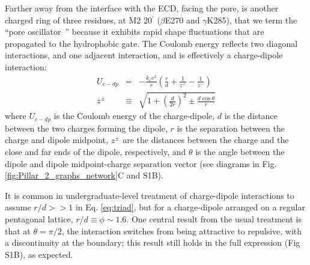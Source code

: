 \documentclass[journal=jacsat,manuscript=article]{achemso}
\newcommand{\sFigEnergy}{S1}
\newcommand{\triad}{pore oscillator~}
\begin{document}
Farther away from the interface with the ECD, facing the pore, is another charged ring of three residues, at M2 20$^{\prime}$ ($\beta$E270 and $\gamma$K285), that we term the ``\triad'' because it exhibits rapid shape fluctuations that are propagated to the hydrophobic gate.  The Coulomb energy reflects two diagonal interactions, and one adjacent interaction, and is effectively a charge-dipole interaction: %
\begin{eqnarray}
U_{c-dp} &=&- { \frac{k_{e} e^{2}}{r}}\left(\frac{r}{d} + \frac{1}{z^{+}} 
- \frac{1}{z^{-}}\right)\label{eq:triad} \\ 
  z^{\pm}&\equiv&\sqrt{{1+\left(\frac{d}{2 r}\right)^{2} \pm  \frac{ d\cos \theta}{r} }}
\end{eqnarray}
where $U_{c-dp}$ is the Coulomb energy of the charge-dipole, $d$ is the distance between the two charges forming the dipole, $r$ is the separation between the charge and dipole midpoint, $z^{\pm}$ are the distances between the charge and the close and far ends of the dipole, respectively, and $\theta$ is the angle between the dipole and dipole midpoint-charge separation vector (see diagrams in Fig. \ref{fig:Pillar_2_graphs_network}C and \sFigEnergy B). 

It is common in undergraduate-level treatment of charge-dipole interactions to assume $r/d>> 1$ in Eq. \ref{eq:triad}, but for a charge-dipole arranged on a regular pentagonal lattice,  $r/d \equiv \phi \sim1.6$.  One central result from the usual treatment is that at $\theta = \pi/2$, the interaction switches from being attractive to repulsive, with a discontinuity at the boundary; this result still holds in the full expression (Fig \sFigEnergy B), 
as expected.  
\end{document}
